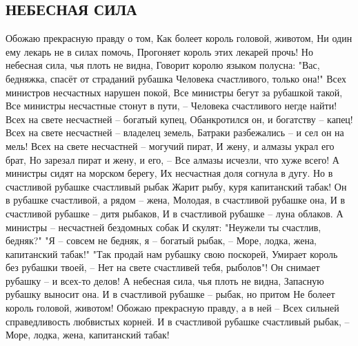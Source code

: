  
 
 
 
 

\subsection{НЕБЕСНАЯ СИЛА}
\label{sec:15_04_2021.fb.morits_junna.1.korol_schastje_poezia}

Обожаю прекрасную правду о том,
Как болеет король головой, животом,
Ни один ему лекарь не в силах помочь,
Прогоняет король этих лекарей прочь!
Но небесная сила, чья плоть не видна,
Говорит королю языком полусна:
"Вас, бедняжка, спасёт от страданий рубашка
Человека счастливого, только она!"
Всех министров несчастных нарушен покой,
Все министры бегут за рубашкой такой,
Все министры несчастные стонут в пути, –
Человека счастливого негде найти!
Всех на свете несчастней – богатый купец,
Обанкротился он, и богатству – капец!
Всех на свете несчастней – владелец земель,
Батраки разбежались – и сел он на мель!
Всех на свете несчастней – могучий пират,
И жену, и алмазы украл его брат,
Но зарезал пират и жену, и его, –
Все алмазы исчезли, что хуже всего!
А министры сидят на морском берегу,
Их несчастная доля согнула в дугу.
Но в счастливой рубашке счастливый рыбак
Жарит рыбу, куря капитанский табак!
Он в рубашке счастливой, а рядом – жена,
Молодая, в счастливой рубашке она,
И в счастливой рубашке – дитя рыбаков,
И в счастливой рубашке – луна облаков.
А министры – несчастней бездомных собак
И скулят: "Неужели ты счастлив, бедняк?"
"Я – совсем не бедняк, я – богатый рыбак, –
Море, лодка, жена, капитанский табак!"
"Так продай нам рубашку свою поскорей,
Умирает король без рубашки твоей, –
Нет на свете счастливей тебя, рыболов"!
Он снимает рубашку – и всех-то делов!
А небесная сила, чья плоть не видна,
Запасную рубашку выносит она.
И в счастливой рубашке – рыбак, но притом
Не болеет король головой, животом!
Обожаю прекрасную правду, а в ней –
Всех сильней справедливость любвистых корней.
И в счастливой рубашке счастливый рыбак, –
Море, лодка, жена, капитанский табак!
